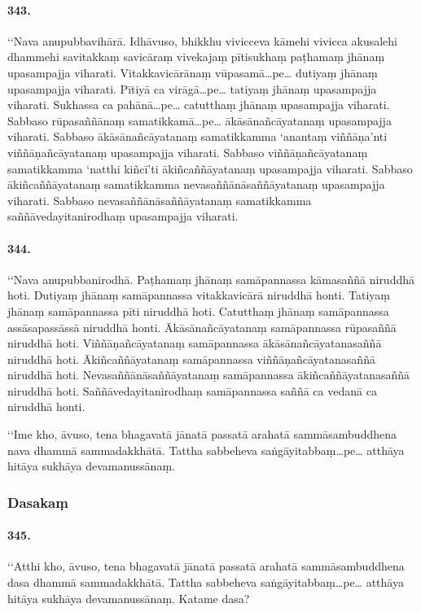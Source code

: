 \paragraph{343.} ‘‘Nava anupubbavihārā. Idhāvuso, bhikkhu vivicceva kāmehi vivicca akusalehi dhammehi savitakkaṃ savicāraṃ vivekajaṃ pītisukhaṃ paṭhamaṃ jhānaṃ upasampajja viharati. Vitakkavicārānaṃ vūpasamā…pe… dutiyaṃ jhānaṃ upasampajja viharati. Pītiyā ca virāgā…pe… tatiyaṃ jhānaṃ upasampajja viharati. Sukhassa ca pahānā…pe… catutthaṃ jhānaṃ upasampajja viharati. Sabbaso rūpasaññānaṃ samatikkamā…pe… ākāsānañcāyatanaṃ upasampajja viharati. Sabbaso ākāsānañcāyatanaṃ samatikkamma ‘anantaṃ viññāṇa’nti viññāṇañcāyatanaṃ upasampajja viharati. Sabbaso viññāṇañcāyatanaṃ samatikkamma ‘natthi kiñcī’ti ākiñcaññāyatanaṃ upasampajja viharati. Sabbaso ākiñcaññāyatanaṃ samatikkamma nevasaññānāsaññāyatanaṃ upasampajja viharati. Sabbaso nevasaññānāsaññāyatanaṃ samatikkamma saññāvedayitanirodhaṃ upasampajja viharati.

\paragraph{344.} ‘‘Nava anupubbanirodhā. Paṭhamaṃ jhānaṃ samāpannassa kāmasaññā niruddhā hoti. Dutiyaṃ jhānaṃ samāpannassa vitakkavicārā niruddhā honti. Tatiyaṃ jhānaṃ samāpannassa pīti niruddhā hoti. Catutthaṃ jhānaṃ samāpannassa assāsapassāssā niruddhā honti. Ākāsānañcāyatanaṃ samāpannassa rūpasaññā niruddhā hoti. Viññāṇañcāyatanaṃ samāpannassa ākāsānañcāyatanasaññā niruddhā hoti. Ākiñcaññāyatanaṃ samāpannassa viññāṇañcāyatanasaññā niruddhā hoti. Nevasaññānāsaññāyatanaṃ samāpannassa ākiñcaññāyatanasaññā niruddhā hoti. Saññāvedayitanirodhaṃ samāpannassa saññā ca vedanā ca niruddhā honti.

‘‘Ime kho, āvuso, tena bhagavatā jānatā passatā arahatā sammāsambuddhena nava dhammā sammadakkhātā. Tattha sabbeheva saṅgāyitabbaṃ…pe… atthāya hitāya sukhāya devamanussānaṃ.

\subsubsection{Dasakaṃ}

\paragraph{345.} ‘‘Atthi kho, āvuso, tena bhagavatā jānatā passatā arahatā sammāsambuddhena dasa dhammā sammadakkhātā. Tattha sabbeheva saṅgāyitabbaṃ…pe… atthāya hitāya sukhāya devamanussānaṃ. Katame dasa?

